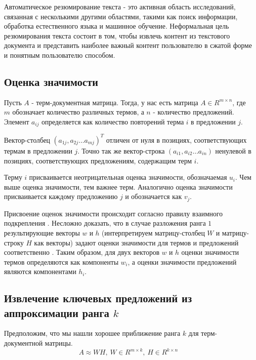 Автоматическое резюмирование текста - это активная область исследований, связанная с несколькими другими областями,
такими как поиск информации, обработка естественного языка и машинное обучение.
Неформальная цель резюмирования текста состоит в том, чтобы извлечь контент из текстового документа
и представить наиболее важный контент пользователю в сжатой форме и понятным пользователю способом.



\subsection{Оценка значимости}

Пусть $A$ - терм-документная матрица. Тогда, у нас есть матрица $A \in R^{m \times n}$,
где $m$ обозначает количество различных термов, а $n$ - количество предложений.
Элемент $a_{ij}$ определяется как количество повторений терма $i$ в предложении $j$.

Вектор-столбец $(a_{1j}, a_{2j} \ldots a_{mj})^T$ отличен от нуля в позициях, соответствующих термам в предложении $j$.
Точно так же вектор-строка $(a_{i1}, a_{i2} \ldots a_{in})$ ненулевой в позициях, соответствующих предложениям, содержащим терм $i$.

Терму $i$ присваивается неотрицательная оценка значимости, обозначаемая $u_i$.
Чем выше оценка значимости, тем важнее терм. Аналогично оценка значимости присваивается каждому предложению $j$ и обозначается как $v_j$.

Присвоение оценок значимости происходит согласно правилу взаимного подкрепления \cite{zha}.
Несложно доказать, что в случае разложения ранга $1$ результирующие векторы $w$ и $h$
(интерпретируем матрицу-столбец $W$ и матрицу-строку $H$ как векторы) задают оценки значимости для термов и предложений соответственно \cite{elden}.
Таким образом, для двух векторов $w$ и $h$ оценки значимости термов определяются как компоненты $w_i$,
а оценки значимости предложений являются компонентами $h_i$.



\newpage



\subsection{Извлечение ключевых предложений из аппроксимации ранга $k$}

Предположим, что мы нашли хорошее приближение ранга $k$ для терм-\\документной матрицы.
\begin{equation*}
  A \approx W H, \ W \in R^{m \times k}, \ H \in R^{k \times n}
\end{equation*}

